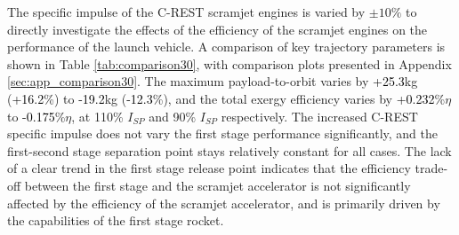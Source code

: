 \noindent
The specific impulse of the C-REST scramjet engines is varied by $\pm10\%$ to directly investigate the effects of the efficiency of the scramjet engines on the performance of the launch vehicle. A comparison of key trajectory parameters is shown in Table \ref{tab:comparison30}, with comparison plots presented in Appendix \ref{sec:app_comparison30}. The maximum payload-to-orbit varies by \textcolor{black}{+25.3}kg (\textcolor{black}{+16.2}\%) to \textcolor{black}{-19.2}kg (\textcolor{black}{-12.3}\%), and the total exergy efficiency varies by \textcolor{black}{+0.232}\%$\eta$ to \textcolor{black}{-0.175}\%$\eta$, at 110\% $I_{SP}$ and 90\% $I_{SP}$ respectively. 
The increased C-REST specific impulse does not vary the first stage performance significantly, and the first-second stage separation point stays relatively constant for all cases.   
The lack of a clear trend in the first stage release point indicates that the efficiency trade-off between the first stage and the scramjet accelerator is not significantly affected by the efficiency of the scramjet accelerator, and is primarily driven by the capabilities of the first stage rocket. 

